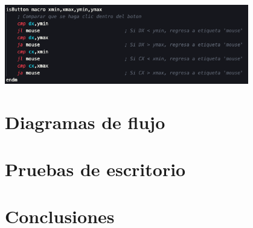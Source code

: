 \documentclass[letterpaper,12 pt,titlepage]{article}
\begin{document}
    \begin{center}
        \includegraphics[width=0.8\textwidth]{img/19.png}
    \end{center}

    \section{Diagramas de flujo}
    
    \section{Pruebas de escritorio}
    \section{Conclusiones}
\end{document}
